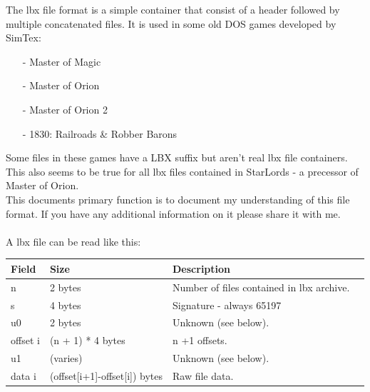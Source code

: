 \documentclass[a4paper]{scrartcl}
\begin{document}
\thispagestyle{empty}
\pagestyle{empty}
The lbx file format is a simple container that consist of a header followed by multiple concatenated files. It is used in some old DOS games developed by SimTex:
\begin{itemize}
\item[-] Master of Magic
\item[-] Master of Orion
\item[-] Master of Orion 2
\item[-] 1830: Railroads \& Robber Barons
\end{itemize}
Some files in these games have a LBX suffix but aren't real lbx file containers. This also seems to be true for all lbx files contained in StarLords - a precessor of Master of Orion.\\
This documents primary function is to document my understanding of this file format. If you have any additional information on it please share it with me.\\\\
A lbx file can be read like this:
\begin{flushleft}
\begin{tabular}{|l|l|l|l|}
\hline
\textbf{Field} & \textbf{Size} & \textbf{Description}\\ 
\hline \hline
n & 2 bytes & Number of files contained in lbx archive.\\\hline
s & 4 bytes & Signature - always 65197\\\hline
u0 & 2 bytes & Unknown (see below).\\\hline
offset i & (n + 1) * 4 bytes & n +1 offsets.\\\hline
u1 & (varies) & Unknown (see below).\\\hline
data i & (offset[i+1]-offset[i]) bytes & Raw file data.\\\hline

\end{tabular}
\end{flushleft}
\end{document}
